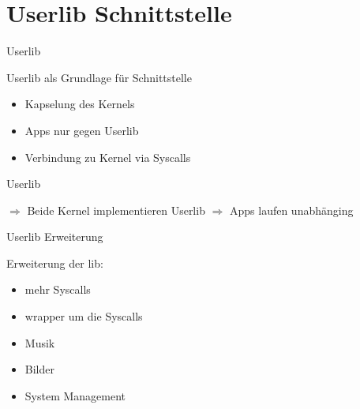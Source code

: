 \section{Userlib Schnittstelle}



\begin{frame}{Userlib}
    \begin{Large}
        Userlib als Grundlage für Schnittstelle
    \end{Large}
    \vspace{15pt}

    \begin{itemize}
        \item Kapselung des Kernels
        \item Apps nur gegen Userlib
        \item Verbindung zu Kernel via Syscalls
    \end{itemize}
    
\end{frame}


\begin{frame}{Userlib}
    \begin{Large}
        $\Rightarrow$ Beide Kernel implementieren Userlib \newline \newline
        $\Rightarrow$ Apps laufen unabhänging
    \end{Large}
    \vspace{15pt}
\end{frame}


\begin{frame}{Userlib Erweiterung}
    \begin{Large}
        Erweiterung der lib: {\tiny \cite{usrlib-repo}}
    \end{Large}
    \vspace{15pt}

    \begin{itemize}
        \item mehr Syscalls
        \item wrapper um die Syscalls
        \item Musik
        \item Bilder
        \item System Management
    \end{itemize}
\end{frame}


